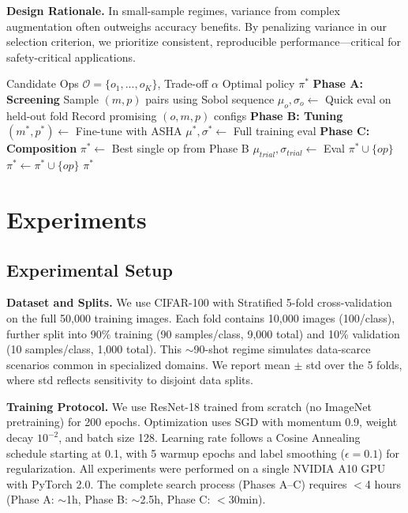 \documentclass[conference,letterpaper]{IEEEtran}
\begin{document}
\textbf{Design Rationale.} In small-sample regimes, variance from complex augmentation often outweighs accuracy benefits. By penalizing variance in our selection criterion, we prioritize consistent, reproducible performance---critical for safety-critical applications.

\begin{algorithm}[htbp]
\caption{SAS: Stability-aware Augmentation Search}
\label{alg:sas}
\begin{algorithmic}[1]
\Require Candidate Ops $\mathcal{O} = \{o_1, ..., o_K\}$, Trade-off $\alpha$
\Ensure Optimal policy $\pi^*$
\State \textbf{Phase A: Screening}
    \State Sample $(m, p)$ pairs using Sobol sequence
    \State $\mu_o, \sigma_o \leftarrow$ Quick eval on held-out fold
    \State Record promising $(o, m, p)$ configs
\EndFor
\State \textbf{Phase B: Tuning}
    \State $(m^*, p^*) \leftarrow$ Fine-tune with ASHA
    \State $\mu^*, \sigma^* \leftarrow$ Full training eval
\EndFor
\State \textbf{Phase C: Composition}
\State $\pi^* \leftarrow$ Best single op from Phase B
    \State $\mu_{trial}, \sigma_{trial} \leftarrow$ Eval $\pi^* \cup \{op\}$
        \State $\pi^* \leftarrow \pi^* \cup \{op\}$ 
    \EndIf
\EndFor
\State \Return $\pi^*$ 
\end{algorithmic}
\end{algorithm}

\section{Experiments}

\subsection{Experimental Setup}
\textbf{Dataset and Splits.} We use CIFAR-100 \cite{krizhevsky2009learning} with Stratified 5-fold cross-validation on the full 50,000 training images. Each fold contains 10,000 images (100/class), further split into 90\% training (90 samples/class, 9,000 total) and 10\% validation (10 samples/class, 1,000 total). This $\sim$90-shot regime simulates data-scarce scenarios common in specialized domains. We report mean $\pm$ std over the 5 folds, where std reflects sensitivity to disjoint data splits.

\textbf{Training Protocol.} We use ResNet-18 \cite{he2016deep} trained from scratch (no ImageNet pretraining) for 200 epochs. Optimization uses SGD with momentum 0.9, weight decay $10^{-2}$, and batch size 128. Learning rate follows a Cosine Annealing schedule starting at 0.1, with 5 warmup epochs and label smoothing ($\epsilon = 0.1$) for regularization. All experiments were performed on a single NVIDIA A10 GPU with PyTorch 2.0. The complete search process (Phases A--C) requires $<$4 hours (Phase A: $\sim$1h, Phase B: $\sim$2.5h, Phase C: $<$30min).
\end{document}
